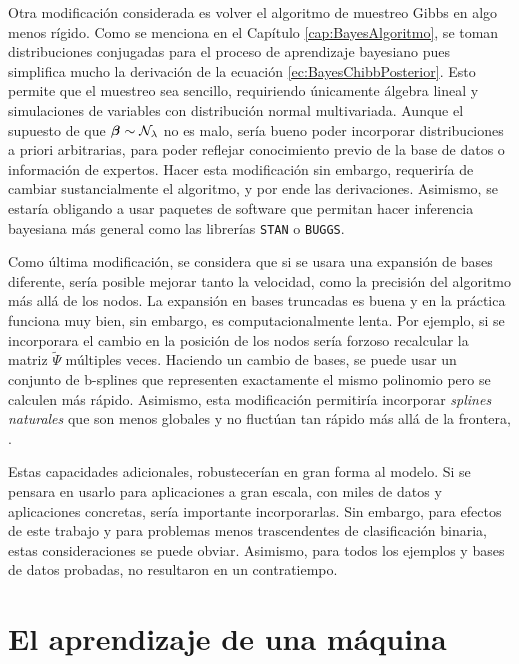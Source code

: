 \documentclass[../Main/Main.tex]{subfiles}
\begin{document}
Otra modificación considerada es volver el algoritmo de muestreo Gibbs en algo menos rígido. Como se menciona en el Capítulo \ref{cap:BayesAlgoritmo}, se toman distribuciones conjugadas para el proceso de aprendizaje bayesiano pues simplifica mucho la derivación de la ecuación \eqref{ec:BayesChibbPosterior}. Esto permite que el muestreo sea sencillo, requiriendo únicamente álgebra lineal y simulaciones de variables con distribución normal multivariada. Aunque el supuesto de que $\bm{\beta}\sim\mathcal{N}_{\lambda}$ no es malo, sería bueno poder incorporar distribuciones a priori arbitrarias, para poder reflejar conocimiento previo de la base de datos o información de expertos. Hacer esta modificación sin embargo, requeriría de cambiar sustancialmente el algoritmo, y por ende las derivaciones. Asimismo, se estaría obligando a usar paquetes de software que permitan hacer inferencia bayesiana más general como las librerías \verb|STAN| o \verb|BUGGS|.

Como última modificación, se considera que si se usara una expansión de bases diferente, sería posible mejorar tanto la velocidad, como la precisión del algoritmo más allá de los nodos. La expansión en bases truncadas es buena y en la práctica funciona muy bien, sin embargo, es computacionalmente lenta. Por ejemplo, si se incorporara el cambio en la posición de los nodos sería forzoso recalcular la matriz $\widetilde{\Psi}$ múltiples veces. Haciendo un cambio de bases, se puede usar un conjunto de b-splines que representen exactamente el mismo polinomio pero se calculen más rápido. Asimismo, esta modificación permitiría incorporar \textit{splines naturales} que son menos globales y no fluctúan tan rápido más allá de la frontera, \citet{wahba1990splines}. 

Estas capacidades adicionales, robustecerían en gran forma al modelo. Si se pensara en usarlo para aplicaciones a gran escala, con miles de datos y aplicaciones concretas, sería importante incorporarlas. Sin embargo, para efectos de este trabajo y para problemas menos trascendentes de clasificación binaria, estas consideraciones se puede obviar. Asimismo, para todos los ejemplos y bases de datos probadas, no resultaron en un contratiempo.

\section{El aprendizaje de una máquina}
\end{document}
